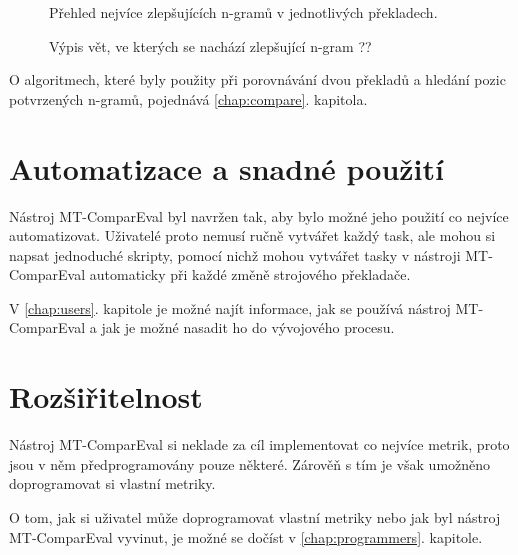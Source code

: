 	\begin{figure}
		\caption{Přehled nejvíce zlepšujících \mbox{n-gramů} v jednotlivých překladech.}
		\label{img:confirmed_ngrams}
	\end{figure}

	\begin{figure}
		\caption{Výpis vět, ve kterých se nachází zlepšující \mbox{n-gram} ??}
		\label{img:filtered_sentences}
	\end{figure}

	O algoritmech,
	  které byly použity při porovnávání dvou překladů a hledání pozic potvrzených \mbox{n-gramů},
  pojednává \ref{chap:compare}. kapitola.


\section{Automatizace a snadné použití}
Nástroj MT-ComparEval byl navržen tak,
  aby bylo možné jeho použití co nejvíce automatizovat.
Uživatelé proto nemusí ručně vytvářet každý task,
  ale mohou si napsat jednoduché skripty,
  pomocí nichž mohou vytvářet tasky v nástroji MT-ComparEval automaticky při každé změně strojového překladače.

V \ref{chap:users}. kapitole je možné najít informace,
  jak se používá nástroj MT-ComparEval
  a jak je možné nasadit ho do vývojového procesu.

\section{Rozšiřitelnost}
Nástroj MT-ComparEval si neklade za cíl implementovat co nejvíce metrik,
  proto jsou v něm předprogramovány pouze některé.
Zárověň s tím je však umožněno doprogramovat si vlastní metriky.

O tom, jak si uživatel může doprogramovat vlastní metriky nebo jak byl nástroj MT-ComparEval vyvinut,
  je možné se dočíst v \ref{chap:programmers}. kapitole.

